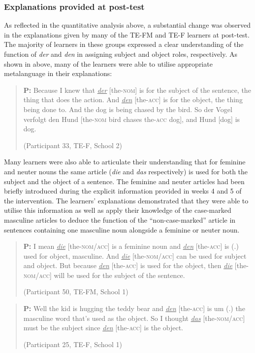 \documentclass[output=paper]{langscibook}
\begin{document}
\subsubsection{Explanations provided at post-test}

As reflected in the quantitative analysis above, a substantial change was observed in the explanations given by many of the TE-FM and TE-F learners at post-test. The majority of learners in these groups expressed a clear understanding of the function of \textit{der} and \textit{den} in assigning subject and object roles, respectively. As shown in  above, many of the learners were able to utilise appropriate metalanguage in their explanations:

\begin{quote}
  \textbf{P:} Because I knew that \textit{\ul{der}} [the-\textsc{nom}] is for the subject of the   sentence, the thing that does the action. And \textit{\ul{den}} [the-\textsc{acc}] is   for the object, the thing being done to. And the dog is being   chased by the bird. So der Vogel verfolgt den Hund [the-\textsc{nom}   bird chases the-\textsc{acc} dog], and Hund [dog] is dog. 

(Participant 33, TE-F, School 2)
\end{quote}

Many learners were also able to articulate their understanding that for feminine and neuter nouns the same article (\textit{die} and \textit{das} respectively) is used for both the subject and the object of a sentence. The feminine and neuter articles had been briefly introduced during the explicit information provided in weeks 4 and 5 of the intervention. The learners’ explanations demonstrated that they were able to utilise this information as well as apply their knowledge of the case-marked masculine articles to deduce the function of the ``non-case-marked'' article in sentences containing one masculine noun alongside a feminine or neuter noun.

\begin{quote}
  \textbf{P:} I mean \textit{\ul{die}} [the-\textsc{nom/acc}] is a feminine noun and \textit{\ul{den}}   [the-\textsc{acc}] is (.) used for object, masculine. And \textit{\ul{die}} [the-\textsc{nom/acc}] can be used for subject and object. But because   \textit{\ul{den}} [the-\textsc{acc}] is used for the object, then \textit{\ul{die}} [the-\textsc{nom/acc}]   will be used for the subject of the sentence. 

(Participant 50, TE-FM, School 1)
\end{quote}
\begin{quote}
  \textbf{P:} Well the kid is hugging the teddy bear and \textit{\ul{den}} [the-\textsc{acc}] is   um (.) the masculine word that’s   used as the object. So I   thought \textit{\ul{das}} [the-\textsc{nom/acc}] must be the subject since \textit{\ul{den}}   [the-\textsc{acc}] is the object. 
  
  (Participant 25, TE-F, School 1)
\end{quote}
\end{document}
